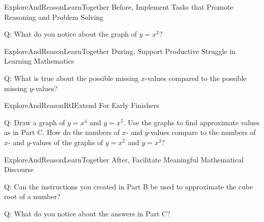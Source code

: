 \documentclass{article}
\newenvironment{te-addendum}[2]{}{}     %
\newcommand{\answer}[1]{}               %
\begin{document}
\begin{te-addendum}{ExploreAndReason}{LearnTogether}
Before, Implement Tasks that Promote Reasoning and Problem Solving

Q: What do you notice about the graph of \(y=x^2\)?

\answer{The graph is a parabola. All values of \(y\) are greater than or equal to zero.}
\end{te-addendum}

\begin{te-addendum}{ExploreAndReason}{LearnTogether}
During, Support Productive Struggle in Learning Mathematics

Q: What is true about the possible missing \(x\)-values compared to the possible missing \(y\)-values?

\answer{For every ordered pair that is missing an \(x\)-value, there are 2 possible values for \(x\). For every ordered pair that is missing a \(y\)-value, there is only 1 possible value for \(y\).}
\end{te-addendum}

\begin{te-addendum}{ExploreAndReason}{RtIExtend}
For Early Finishers

Q: Draw a graph of \(y=x^4\) and \(y=x^5\). Use the graphs to find approximate values as in Part C. How do the numbers of \(x\)- and \(y\)-values compare to the numbers of \(x\)- and \(y\)-values of the graphs of \(y=x^2\) and \(y=x^3\)?

\answer{Each \(y\)-value for \(y=x^4\) has 2 possible \(x\)-values, like \(y=x^2\). Each \(y\)-value for \(y=x^5\) has 1 possible \(x\)-value, like \(y=x^3\).}
\end{te-addendum}

\begin{te-addendum}{ExploreAndReason}{LearnTogether}
After, Facilitate Meaningful Mathematical Discourse

Q: Can the instructions you created in Part B be used to approximate the cube root of a number?

\answer{Yes; the instructions also work for finding cube roots. Use the graph to find a point with a \(y\)-value that is placed under the radical sign. Then find the cube root to find the corresponding \(x\)-value of that point.}

Q: What do you notice about the answers in Part C?

\answer{The value for \(\sqrt[3]{5}\) is the same as the solution to \(x^3=5\), the value for \(\sqrt[3]{-5}\) is the same as the solution to \(x^3=-5\), and the value for \(\sqrt[3]{8}\) is the same as the solution to \(x^3=8\).}
\end{te-addendum}
\end{document}
